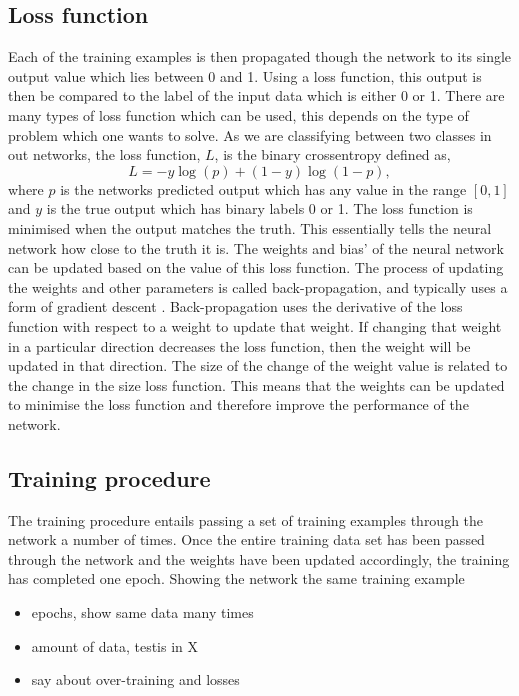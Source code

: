 \subsection{Loss function}

%
Each of the training examples is then propagated though the network to its single output value which lies between 0 and 1. Using a loss function, this output is then be compared to
the label of the input data which is either 0 or 1. There are many types of loss function which can be used, this depends on the type of problem which one wants to solve. As we are classifying
between two classes in out networks, the loss function, $L$, is the binary
crossentropy defined as,
%
\begin{equation}\label{cnn:loss} 
L = -y\log{(p)} + (1-y)\log{(1-p)},
\end{equation}
%
where $p$ is the networks predicted output which has any value in the range $[0,1]$ and $y$ is the true output which has binary labels 0 or 1. 
The loss function is minimised when the output matches the truth. This essentially
tells the neural network how close to the truth it is. The weights and bias' of
the neural network can be updated based on the value of this loss function. The
process of updating the weights and other parameters is called back-propagation,
and typically uses a form of gradient descent
\cite{kingma2015AdamMethod}.
Back-propagation uses the derivative of the loss function with respect to a weight to update that weight.
If changing that weight in a particular direction decreases the loss function, then the weight will be updated in that direction.
The size of the change of the weight value is related to the change in the size loss function.
This means that the weights can be updated to minimise the loss function and therefore improve the performance of the network.

\subsection{Training procedure}

The training procedure entails passing a set of training examples through the network a number of times. 
Once the entire training data set has been passed through the network and the weights have been updated accordingly, the training has completed one epoch.
Showing the network the same training example 

\begin{itemize}
	\item epochs, show same data many times
	\item amount of data, testis in X
	\item say about over-training and losses
\end{itemize}

